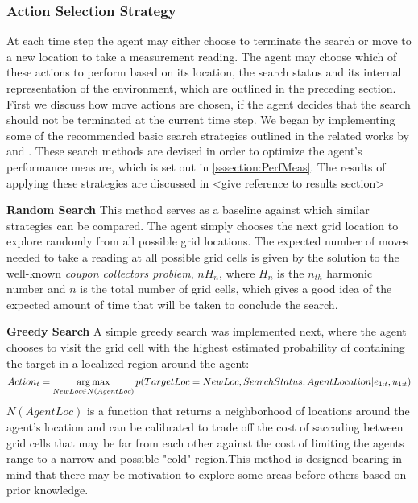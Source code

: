 \subsubsection{Action Selection Strategy}\label{subsubsec:ActionSelection}
\workinprogress
At each time step the agent may either choose to terminate the search or move to a new location to take a measurement reading. The agent may choose which of these actions to perform based on its location, the search status and its internal representation of the environment, which are outlined in the preceding section. First we discuss how move actions are chosen, if the agent decides that the search should not be terminated at the current time step. We began by implementing some of the recommended basic search strategies outlined in the related works by \citeauthor{Chung2007ASearchb} \cite{Chung2007ASearchb} and \citeauthor{Waharte2010SupportingUAVs} \cite{Waharte2010SupportingUAVs}. These search methods are devised in order to optimize the agent's performance measure, which is set out in \ref{sssection:PerfMeas}. The results of applying these strategies are discussed in <give reference to results section>\par 
{}
\textbf{Random Search}
This method serves as a baseline against which similar strategies can be compared. The agent simply chooses the next grid location to explore randomly from all possible grid locations. The expected number of moves needed to take a reading at all possible grid cells is given by the solution to the well-known \textit{coupon collectors problem}, $nH_n$, where $H_n$ is the $n_{th}$ harmonic number and $n$ is the total number of grid cells, which gives a good idea of the expected amount of time that will be taken to conclude the search.

\textbf{Greedy Search}
A simple greedy search was implemented next, where the agent chooses to visit the grid cell with the highest estimated probability of containing the target in a localized region around the agent:
\footnotesize
\[
Action_t = \operatorname*{arg\,max}_{NewLoc \in N(AgentLoc)}{p(TargetLoc = NewLoc, SearchStatus, AgentLocation| e_{1:t}, u_{1:t})}
\]
\normalsize
$N(AgentLoc)$ is a function that returns a neighborhood of locations around the agent's location and can be calibrated to trade off the cost of saccading between grid cells that may be far from each other against the cost of limiting the agents range to a narrow and possible "cold" region.This method is designed bearing in mind that there may be motivation to explore some areas before others based on prior knowledge. 

